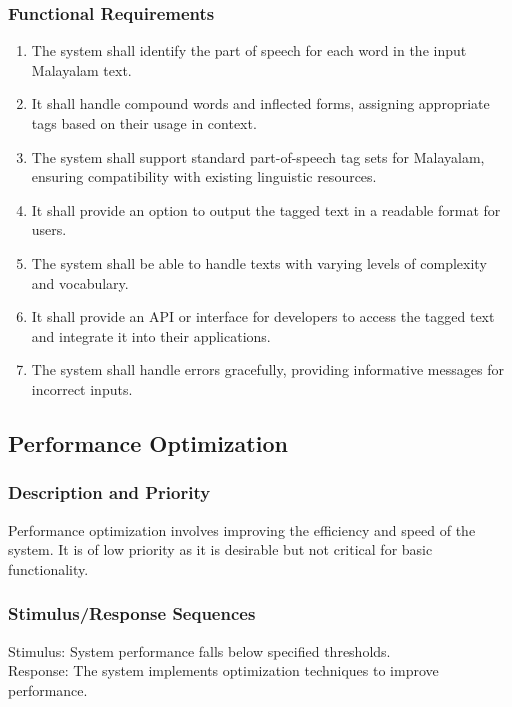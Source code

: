 \documentclass[12pt]{article}
\begin{document}
	\subsubsection{Functional Requirements}
	\begin{enumerate}
		\item The system shall identify the part of speech for each word in the input Malayalam
		text.
		\item It shall handle compound words and inflected forms, assigning appropriate tags
		based on their usage in context.
		\item The system shall support standard part-of-speech tag sets for Malayalam,
		ensuring compatibility with existing linguistic resources.
		\item It shall provide an option to output the tagged text in a readable format for users.
		\item The system shall be able to handle texts with varying levels of complexity and
		vocabulary.
		\item It shall provide an API or interface for developers to access the tagged text and
		integrate it into their applications.
		\item The system shall handle errors gracefully, providing informative messages for
		incorrect inputs.
	\end{enumerate}

	\subsection{Performance Optimization}
	\subsubsection{Description and Priority}
	Performance optimization involves improving the efficiency and speed of the system. It is
	of low priority as it is desirable but not critical for basic functionality.
	
	\subsubsection{Stimulus/Response Sequences}
	Stimulus: System performance falls below specified thresholds.\\
	Response: The system implements optimization techniques to improve performance.
	
\end{document}
